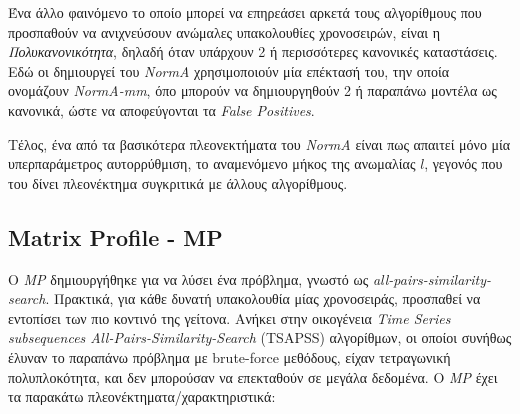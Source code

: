 Ένα άλλο φαινόμενο το οποίο μπορεί να επηρεάσει αρκετά τους αλγορίθμους που προσπαθούν να ανιχνεύσουν ανώμαλες υπακολουθίες χρονοσειρών, είναι η \emph{Πολυκανονικότητα}, δηλαδή όταν υπάρχουν 2 ή περισσότερες κανονικές καταστάσεις. Εδώ οι δημιουργεί του \emph{NormA} χρησιμοποιούν μία επέκτασή του, την οποία ονομάζουν \emph{NormA-mm}, όπο μπορούν να δημιουργηθούν 2 ή παραπάνω μοντέλα ως κανονικά, ώστε να αποφεύγονται τα \emph{False Positives}.

Τέλος, ένα από τα βασικότερα πλεονεκτήματα του \emph{NormA} είναι πως απαιτεί μόνο μία υπερπαράμετρος αυτορρύθμιση, το αναμενόμενο μήκος της ανωμαλίας $l$, γεγονός που του δίνει πλεονέκτημα συγκριτικά με άλλους αλγορίθμους.


\subsection{Matrix Profile - MP}
Ο \emph{MP} \cite{yeh2018time} δημιουργήθηκε για να λύσει ένα πρόβλημα, γνωστό ως \emph{all-pairs-similarity-search}. Πρακτικά, για κάθε δυνατή υπακολουθία μίας χρονοσειράς, προσπαθεί να εντοπίσει των πιο κοντινό της γείτονα. Ανήκει στην οικογένεια \emph{Time Series subsequences All-Pairs-Similarity-Search} (TSAPSS) αλγορίθμων, οι οποίοι συνήθως έλυναν το παραπάνω πρόβλημα με brute-force μεθόδους, είχαν τετραγωνική πολυπλοκότητα, και δεν μπορούσαν να επεκταθούν σε μεγάλα δεδομένα. Ο \emph{MP} έχει τα παρακάτω πλεονέκτηματα/χαρακτηριστικά:
